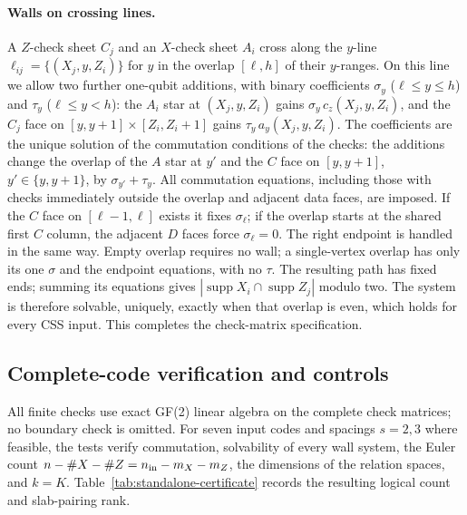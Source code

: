 \paragraph{Walls on crossing lines.}
A $Z$-check sheet $C_j$ and an $X$-check sheet $A_i$ cross along the $y$-line
$\ell_{ij}=\{(X_j,y,Z_i)\}$ for $y$ in the overlap $[\ell,h]$ of their
$y$-ranges.  On this line we allow two further one-qubit additions, with
binary coefficients $\sigma_y$ ($\ell\le y\le h$) and $\tau_y$
($\ell\le y<h$): the $A_i$ star at $(X_j,y,Z_i)$ gains
$\sigma_y\,c_z(X_j,y,Z_i)$, and the $C_j$ face on
$[y,y+1]\times[Z_i,Z_i+1]$ gains $\tau_y\,a_y(X_j,y,Z_i)$.  The coefficients
are the unique solution of the commutation conditions of
the checks: the additions change the overlap of the $A$ star at $y'$ and
the $C$ face on $[y,y+1]$, $y'\in\{y,y+1\}$, by $\sigma_{y'}+\tau_y$.
All commutation equations, including those with checks immediately
outside the overlap and adjacent data faces, are imposed. If the $C$ face
on $[\ell-1,\ell]$ exists it fixes $\sigma_\ell$; if the overlap starts
at the shared first $C$ column, the adjacent $D$ faces force
$\sigma_\ell=0$. The right endpoint is handled in the same way. Empty
overlap requires no wall; a single-vertex overlap has only its one $\sigma$
and the endpoint equations, with no $\tau$. The resulting path has fixed ends; summing its equations gives
$|\operatorname{supp}X_i\cap\operatorname{supp}Z_j|$ modulo two. The system
is therefore solvable, uniquely, exactly when that overlap is even, which
holds for every CSS input. This completes the check-matrix specification.


\subsection{Complete-code verification and controls}
\label{sec:verification-details}
All finite checks use exact GF(2) linear algebra on the complete check
matrices; no boundary check is omitted. For seven input codes and spacings
$s=2,3$ where feasible, the tests verify commutation, solvability of every
wall system, the Euler count $n-\#X-\#Z=n_{\rm in}-m_X-m_Z$, the dimensions
of the relation spaces, and $k=K$. Table~\ref{tab:standalone-certificate}
records the resulting logical count and slab-pairing rank.

